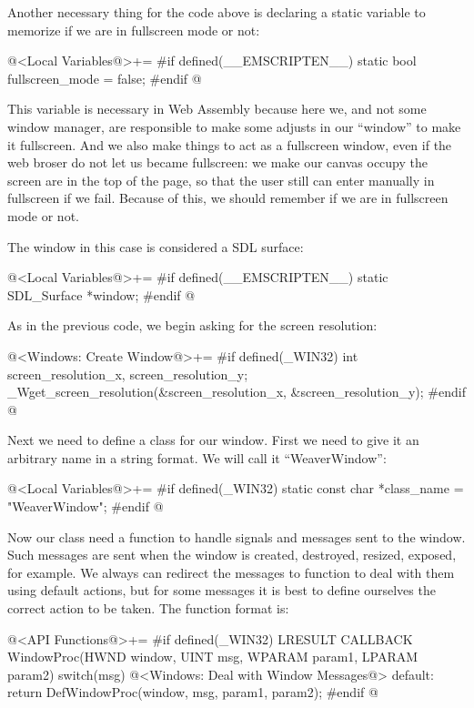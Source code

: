 Another necessary thing for the code above is declaring a static
variable to memorize if we are in fullscreen mode or not:

\iniciocodigo
@<Local Variables@>+=
#if defined(__EMSCRIPTEN__)
static bool fullscreen_mode = false;
#endif
@
\fimcodigo

This variable is necessary in Web Assembly because here we, and not
some window manager, are responsible to make some adjusts in our
``window'' to make it fullscreen. And we also make things to act as a
fullscreen window, even if the web broser do not let us became
fullscreen: we make our canvas occupy the screen are in the top of the
page, so that the user still can enter manually in fullscreen if we
fail. Because of this, we should remember if we are in fullscreen mode
or not.

The window in this case is considered a SDL surface:

\iniciocodigo
@<Local Variables@>+=
#if defined(__EMSCRIPTEN__)
static SDL_Surface *window;
#endif
@
\fimcodigo


As in the previous code, we begin asking for the screen resolution:

\iniciocodigo
@<Windows: Create Window@>+=
#if defined(_WIN32)
int screen_resolution_x, screen_resolution_y;
_Wget_screen_resolution(&screen_resolution_x, &screen_resolution_y);
#endif
@
\fimcodigo

Next we need to define a class for our window. First we need to give
it an arbitrary name in a string format. We will call it
``WeaverWindow'':

\iniciocodigo
@<Local Variables@>+=
#if defined(_WIN32)
static const char *class_name = "WeaverWindow";
#endif
@
\fimcodigo

Now our class need a function to handle signals and messages sent to
the window. Such messages are sent when the window is created,
destroyed, resized, exposed, for example. We always can redirect the
messages to function  to deal with them
using default actions, but for some messages it is best to define
ourselves the correct action to be taken. The function format is:

\iniciocodigo
@<API Functions@>+=
#if defined(_WIN32)
LRESULT CALLBACK WindowProc(HWND window, UINT msg, WPARAM param1, LPARAM param2){
  switch(msg){
    @<Windows: Deal with Window Messages@>
    default:
      return DefWindowProc(window, msg, param1, param2);
  }
}
#endif
@
\fimcodigo

